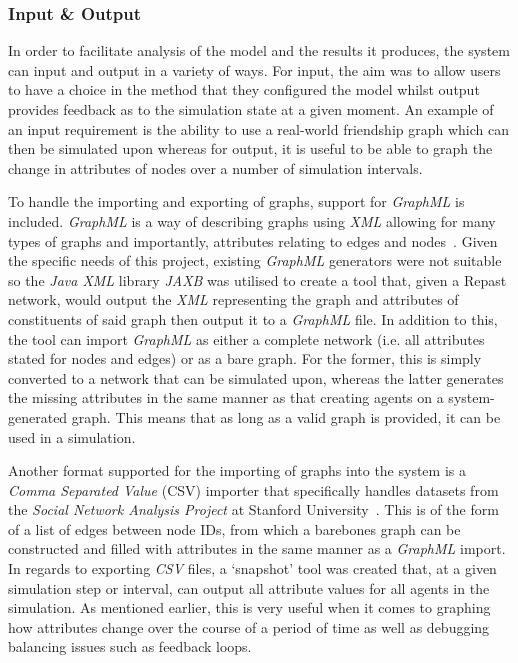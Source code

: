 \documentclass[]{report}
\begin{document}
\subsubsection{Input \& Output}
In order to facilitate analysis of the model and the results it produces, the system can input and output in a variety of ways. For input, the aim was to allow users to have a choice in the method that they configured the model whilst output provides feedback as to the simulation state at a given moment. An example of an input requirement is the ability to use a real-world friendship graph which can then be simulated upon whereas for output, it is useful to be able to graph the change in attributes of nodes over a number of simulation intervals.

To handle the importing and exporting of graphs, support for \emph{GraphML} is included. \emph{GraphML} is a way of describing graphs using \emph{XML} allowing for many types of graphs and importantly, attributes relating to edges and nodes~\cite{graphml}. Given the specific needs of this project, existing \emph{GraphML} generators were not suitable so the \emph{Java XML} library \emph{JAXB} was utilised to create a tool that, given a Repast network, would output the \emph{XML} representing the graph and attributes of constituents of said graph then output it to a \emph{GraphML} file. In addition to this, the tool can import \emph{GraphML} as either a complete network (i.e. all attributes stated for nodes and edges) or as a bare graph. For the former, this is simply converted to a network that can be simulated upon, whereas the latter generates the missing attributes in the same manner as that creating agents on a system-generated graph. This means that as long as a valid graph is provided, it can be used in a simulation.

Another format supported for the importing of graphs into the system is a \emph{Comma Separated Value} (CSV) importer that specifically handles datasets from the \emph{Social Network Analysis Project} at Stanford University~\cite{SNAP}. This is of the form of a list of edges between node IDs, from which a barebones graph can be constructed and filled with attributes in the same manner as a \emph{GraphML} import. In regards to exporting \emph{CSV} files, a `snapshot' tool was created that, at a given simulation step or interval, can output all attribute values for all agents in the simulation. As mentioned earlier, this is very useful when it comes to graphing how attributes change over the course of a period of time as well as debugging balancing issues such as feedback loops.
\end{document}

